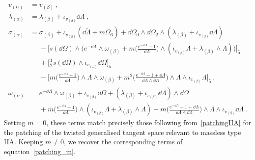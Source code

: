 \documentclass[debug]{phd}
\begin{document}
						\begin{equation*}
							\begin{split}
								v_{(\alpha)}&= v_{(\beta)} \, , \\
								\lambda_{(\alpha)} &= \lambda_{(\beta)} + \iota_{v_{(\beta)}} \dd \Lambda \ , \\
								\sigma_{(\alpha)} &= \sigma_{(\beta)} +\iota_{v_{(\beta)}}(\dd\tilde\Lambda+m\Omega_6) + \dd\Omega_{0} \wedge \dd\Omega_{2} \wedge (\lambda_{(\beta)} + \iota_{ v_{(\beta)}}\dd\Lambda) \\ 
											& \phantom{=} - \big[ s(\dd\Omega)\wedge \big( e^{-\dd\Lambda} \wedge\omega_{(\beta)} + m \big(\tfrac{e^{-\dd\Lambda}-1}{\dd\Lambda}\big)\wedge (\iota_{v_{(\beta)}} \Lambda + \lambda_{(\beta)} \wedge \Lambda)\big)\big]_5 \\
											&\phantom{=} + \big[ \tfrac{1}{2}s(\dd\Omega)\wedge \iota_{v_{(\beta)}}\dd\Omega \big]_5 \\
											&\phantom{=} - \big[m \big(\tfrac{e^{-\dd\Lambda}-1}{\dd\Lambda}\big) \wedge\Lambda\wedge \omega_{(\beta)} + m^2 \big(\tfrac{e^{-\dd\Lambda}-1+ \dd\Lambda}{\dd\Lambda\wedge \dd\Lambda}\big)\wedge \Lambda \wedge \iota_{v_{(\beta)}} \Lambda \big]_5 \ , \\ 
								\omega_{(\alpha)} &= e^{-\dd\Lambda} \wedge\omega_{(\beta)} + \iota_{v_{(\beta)}}\dd\Omega + ( \lambda_{(\beta)} + \iota_{ v_{(\beta)}}\dd\Lambda)\wedge \dd\Omega \\ 
												&\phantom{=} + m \big(\tfrac{e^{-\dd\Lambda}-1}{\dd\Lambda}\big)\wedge (\iota_{v_{(\beta)}} \Lambda + \lambda_{(\beta)} \wedge \Lambda) + m \big(\tfrac{e^{-\dd\Lambda}-1+ \dd\Lambda}{\dd\Lambda\wedge \dd\Lambda}\big)\wedge \Lambda\wedge \iota_{v_{(\beta)}} \dd\Lambda \ .
							\end{split}
						\end{equation*}
				Setting $m=0$, these terms match precisely those following from~\eqref{patchingIIA} for the patching of the twisted generalised tangent space relevant to massless type IIA. 
				Keeping \hbox{$m \neq 0$}, we recover the corresponding terms of equation~\eqref{patching_m}. 
\end{document}
